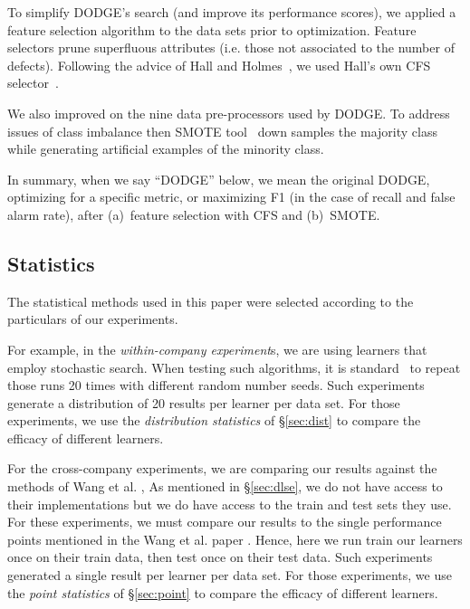 \documentclass[10pt,compsoc,twocolumn]{IEEEtran}
\begin{document}
To simplify DODGE's search (and improve its performance scores), we applied a feature selection algorithm to the data sets prior to optimization. Feature selectors
prune superfluous attributes (i.e. those not associated to the number of defects).
Following the advice of Hall and Holmes~\cite{holmes03}, we used Hall's own  CFS    selector~\cite{hall00}.

We also improved on the   nine data pre-processors used by DODGE. To address issues of class imbalance then SMOTE tool~\cite{Chawla02} down samples the majority class while  generating artificial examples of the minority class.

In summary, when we say ``DODGE'' below, we mean the original DODGE, optimizing for a specific metric, or maximizing F1 (in the case of recall and false alarm rate), after  (a)~feature selection with CFS and (b)~SMOTE. 

\subsection{Statistics}
\label{sec:stats}

The statistical methods used in this paper were selected according to the particulars of our experiments.

For example, in  the {\em within-company experiment}s,  we are using learners that employ stochastic search. When testing such algorithms, it is standard~\cite{arcuri11} to repeat  those runs 20 times with different random number
seeds. Such  experiments generate a distribution of  20 results per learner per data set.
 For those experiments, we use
 the {\em distribution  statistics} of \S\ref{sec:dist}
 to compare the efficacy
 of different learners.
 
 For the cross-company experiments, we are comparing our results against the methods of Wang et al. \cite{wang2016automatically},
 As mentioned in \S\ref{sec:dlse},  we do not have access to their implementations but we do have access to the train and test sets they use. For
 these experiments, we must compare our results to the single performance points mentioned in the  Wang et al. paper \cite{wang2016automatically}.  Hence, here we run train our learners once on their train data, then test once on their test data.
 Such  experiments generated a single result  per learner per data set.
 For those experiments, we use the {\em point  statistics}
 of \S\ref{sec:point}
 to compare the efficacy
 of different learners.
 
 
\end{document}
